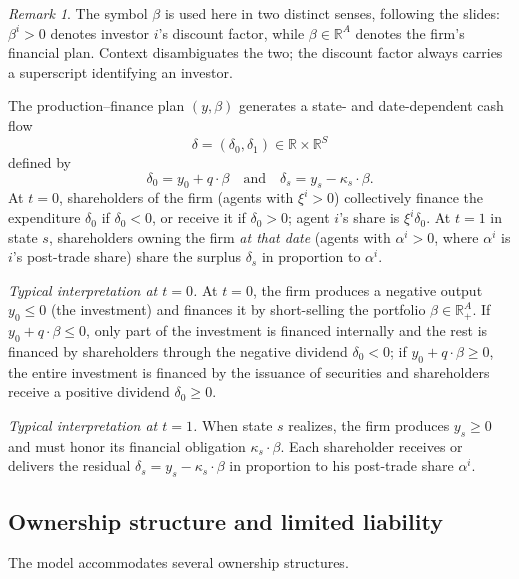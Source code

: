 \documentclass[11pt,a4paper,oneside]{book}
\def\R{\mathbb{R}}
\def\leq{\leqslant}
\def\geq{\geqslant}
\def\et{\quad \text{and} \quad}
\theoremstyle{plain}
\theoremstyle{definition}
\theoremstyle{remark}
\newtheorem{remark}[theorem]{Remark}
\numberwithin{equation}{chapter}
\begin{document}
\begin{remark}\label{rem:beta-abuse}
The symbol $\beta$ is used here in two distinct senses, following the slides: $\beta^i > 0$ denotes investor $i$'s discount factor, while $\beta \in \R^A$ denotes the firm's financial plan.
Context disambiguates the two; the discount factor always carries a superscript identifying an investor.
\end{remark}

The production--finance plan $(y, \beta)$ generates a state- and date-dependent cash flow
\begin{equation*}
  \delta = (\delta_0, \delta_1) \in \R \times \R^S
\end{equation*}
defined by
\begin{equation}\label{eq:cash-flow}
  \delta_0 = y_0 + q \cdot \beta
  \et
  \delta_s = y_s - \kappa_s \cdot \beta.
\end{equation}
At $t=0$, shareholders of the firm (agents with $\xi^i > 0$) collectively finance the expenditure $\delta_0$ if $\delta_0 < 0$, or receive it if $\delta_0 > 0$; agent $i$'s share is $\xi^i \delta_0$.
At $t=1$ in state $s$, shareholders owning the firm \emph{at that date} (agents with $\alpha^i > 0$, where $\alpha^i$ is $i$'s post-trade share) share the surplus $\delta_s$ in proportion to $\alpha^i$.

\emph{Typical interpretation at $t=0$.}
At $t=0$, the firm produces a negative output $y_0 \leq 0$ (the investment) and finances it by short-selling the portfolio $\beta \in \R^A_+$.
If $y_0 + q \cdot \beta \leq 0$, only part of the investment is financed internally and the rest is financed by shareholders through the negative dividend $\delta_0 < 0$; if $y_0 + q \cdot \beta \geq 0$, the entire investment is financed by the issuance of securities and shareholders receive a positive dividend $\delta_0 \geq 0$.

\emph{Typical interpretation at $t=1$.}
When state $s$ realizes, the firm produces $y_s \geq 0$ and must honor its financial obligation $\kappa_s \cdot \beta$.
Each shareholder receives or delivers the residual $\delta_s = y_s - \kappa_s \cdot \beta$ in proportion to his post-trade share $\alpha^i$.

\subsection{Ownership structure and limited liability}

The model accommodates several ownership structures.
\end{document}

